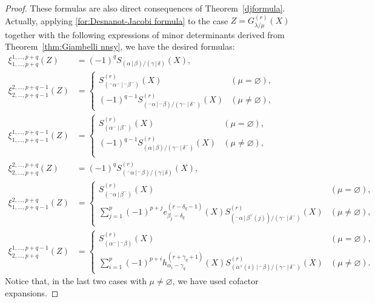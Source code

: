 \documentclass[12pt]{amsart}%
\theoremstyle{definition}
\begin{document}
\begin{proof}
These formulas are also direct consequences of Theorem~\ref{djformula}.
Actually, applying \eqref{for:Desnanot-Jacobi formula} 
to the case $Z=G^{(r)}_{\lambda/\mu}(X)$ together with the following expressions of minor determinants derived from Theorem~\ref{thm:Giambelli nnsy},
we have the desired formulas:
\begin{align*}
\xi^{1,\ldots,p+q}_{1,\ldots,p+q}(Z)
&=(-1)^qS_{(\alpha\,|\,\beta)/(\gamma\,|\,\delta)}(X),\\
\xi^{2,\ldots,p+q-1}_{2,\ldots,p+q-1}(Z)
&=
\begin{cases}
S_{({}^{-}\alpha^{-}\,|\,{}^{-}\beta^{-})}^{(r)}(X)
& (\mu=\varnothing),\\
(-1)^{q-1}S_{({}^{-}\alpha\,|\,{}^{-}\beta)/(\gamma^{-}\,|\,\delta^{-})}^{(r)}(X) & (\mu\ne \varnothing),
\end{cases}
\\
\xi^{1,\ldots,p+q-1}_{1,\ldots,p+q-1}(Z)
&=
\begin{cases}
S_{(\alpha^{-}\,|\,\beta^{-})}^{(r)}(X) & (\mu=\varnothing),\\
(-1)^{q-1}S_{(\alpha\,|\,\beta)/(\gamma^{-}\,|\,\delta^{-})}^{(r)}(X) & (\mu\ne \varnothing),\\
\end{cases}
\\
\xi^{2,\ldots,p+q}_{2,\ldots,p+q}(Z)
&=(-1)^qS_{({}^{-}\alpha\,|\,{}^{-}\beta)/(\gamma\,|\,\delta)}^{(r)}(X),\\
\xi^{2,\ldots,p+q}_{1,\ldots,p+q-1}(Z)
&=\begin{cases}
S_{({}^{-}\alpha\,|\,\beta^{-})}^{(r)}(X) & (\mu=\varnothing),\\[5pt]
\displaystyle{\sum^{p}_{j=1}(-1)^{p+j}e_{\beta_j-\delta_q}^{(r-\delta_q-1)}(X)S_{({}^{-}\alpha\,|\,\beta^{\vee}(j))/(\gamma^{-}\,|\,\delta^{-})}^{(r)}(X)} & (\mu\ne \varnothing),
\end{cases}
\\
\xi^{1,\ldots,p+q-1}_{2,\ldots,p+q}(Z)
&=\begin{cases}
S_{(\alpha^{-}\,|\,{}^{-}\beta)}^{(r)}(X) & (\mu=\varnothing),\\[5pt]
\displaystyle{\sum^{p}_{i=1}(-1)^{p+i}h_{\alpha_i-\gamma_q}^{(r+\gamma_q+1)}(X)S_{(\alpha^{\vee}(i)\,|\,{}^{-}\beta)/(\gamma^{-}\,|\,\delta^{-})}^{(r)}(X)} & (\mu\ne \varnothing).
\end{cases}
\end{align*}
Notice that,
in the last two cases with $\mu\ne\varnothing$, 
we have used cofactor expansions.
\end{proof}
\end{document}
